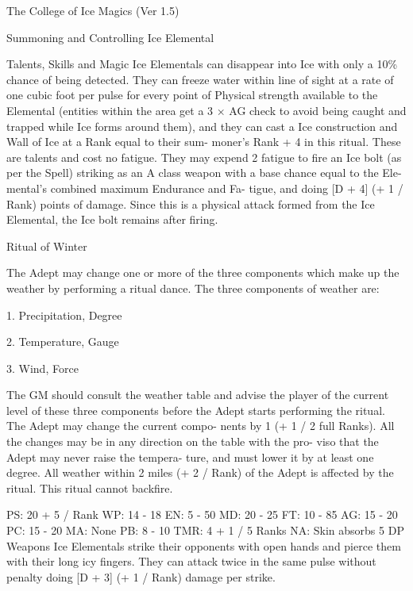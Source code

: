 \begin{Chapter}{The College of Ice Magics (Ver 1.5)}
\begin{ritual}[R-2]{Summoning and Controlling Ice Elemental }
\begin{effects}
Talents,  Skills  and  Magic  Ice  Elementals  can 
disappear into Ice with only a 10\% chance of being 
detected. They can freeze water within line of sight 
at a rate of one cubic foot per pulse for every point 
of  Physical  strength  available  to  the  Elemental 
(entities  within  the  area  get  a  3  ×  AG  check  to 
avoid  being  caught  and  trapped  while  Ice  forms 
around them), and they can cast a  Ice construction 
and  Wall  of  Ice  at  a  Rank  equal  to  their  sum-
moner’s  Rank  +  4  in  this  ritual.  These  are  talents 
and cost no fatigue. They may expend 2 fatigue to 
fire  an  Ice  bolt  (as  per  the  Spell)  striking  as  an  A 
class weapon with a base chance equal to the Ele-
mental’s  combined  maximum  Endurance  and  Fa-
tigue,  and  doing  [D  +  4]  (+  1  /  Rank)  points  of 
damage.  Since  this  is  a  physical  attack  formed 
from  the  Ice  Elemental,  the  Ice  bolt  remains  after 
firing. 

\end{effects}
\end{ritual}

\begin{ritual}[R-3]{Ritual of Winter }

\begin{effects}
The Adept may change one or more of the 
three  components  which  make  up  the  weather  by 
performing a ritual dance. The three components of 
weather are: 

1. Precipitation, Degree 

2. Temperature, Gauge 

3. Wind, Force 

The  GM  should  consult  the  weather  table  and 
advise the player of the current level of these three 
components before the Adept starts performing the 
ritual.  The  Adept  may  change  the  current  compo-
nents  by  1  (+  1  /  2  full  Ranks).  All  the  changes 
may  be  in any  direction  on  the  table  with  the  pro-
viso  that  the  Adept  may  never  raise  the  tempera-
ture,  and must  lower  it  by  at  least  one  degree.  All 
weather within 2 miles (+ 2 / Rank) of the Adept is 
affected by the ritual. This ritual cannot backfire. 

PS: 20 + 5 / Rank  WP: 14 - 18 
EN: 5 - 50 
MD: 20 - 25 
FT: 10 - 85 
AG: 15 - 20 
PC: 15 - 20 
MA: None 
PB: 8 - 10 
TMR: 4 + 1 / 5 Ranks 
NA: Skin absorbs 5 DP 
Weapons  Ice  Elementals  strike  their  opponents 
with  open  hands  and  pierce  them  with  their  long 
icy fingers. They can attack twice in the same pulse 
without penalty doing [D + 3] (+ 1 / Rank) damage 
per strike. 


\end{effects}
\end{ritual}
\end{Chapter}
